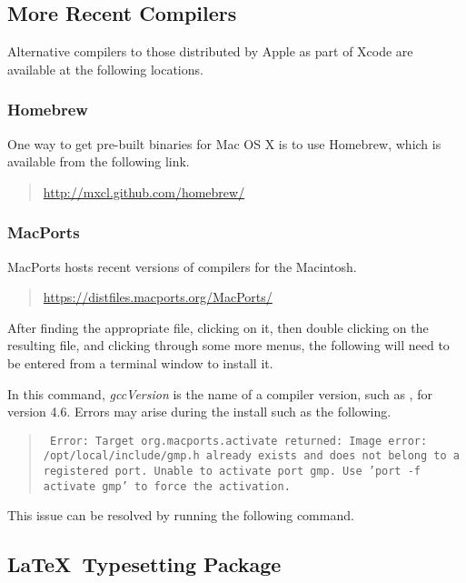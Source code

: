 \subsection{More Recent Compilers}

Alternative compilers to those distributed by Apple as part of Xcode
are available at the following locations.

\subsubsection{Homebrew}

One way to get pre-built binaries for Mac OS X is to use Homebrew,
which is available from the following link.
\begin{quote}
\url{http://mxcl.github.com/homebrew/}
\end{quote}

\subsubsection{MacPorts}

MacPorts hosts recent versions of compilers for the Macintosh.
%
\begin{quote}
\url{https://distfiles.macports.org/MacPorts/}
\end{quote}
%
After finding the appropriate  file, clicking on it, then
double clicking on the resulting  file, and clicking
through some more menus, the following will need to be entered from a
terminal window to install it.
%
\begin{quote}
\end{quote}
%
In this command, {\slshape gccVersion} is the name of a compiler
version, such as , for version 4.6.  Errors may arise
during the install such as the following.
%
\begin{quote}\small\tt
  Error: Target org.macports.activate returned: Image error:
  /opt/local/include/gmp.h already exists and does not belong to a
  registered port.  Unable to activate port gmp. Use 'port -f activate
  gmp' to force the activation.
\end{quote}
%
This issue can be resolved by running the following command.
%
\begin{quote}
\end{quote}
%

\subsection{\LaTeX\ Typesetting Package}

